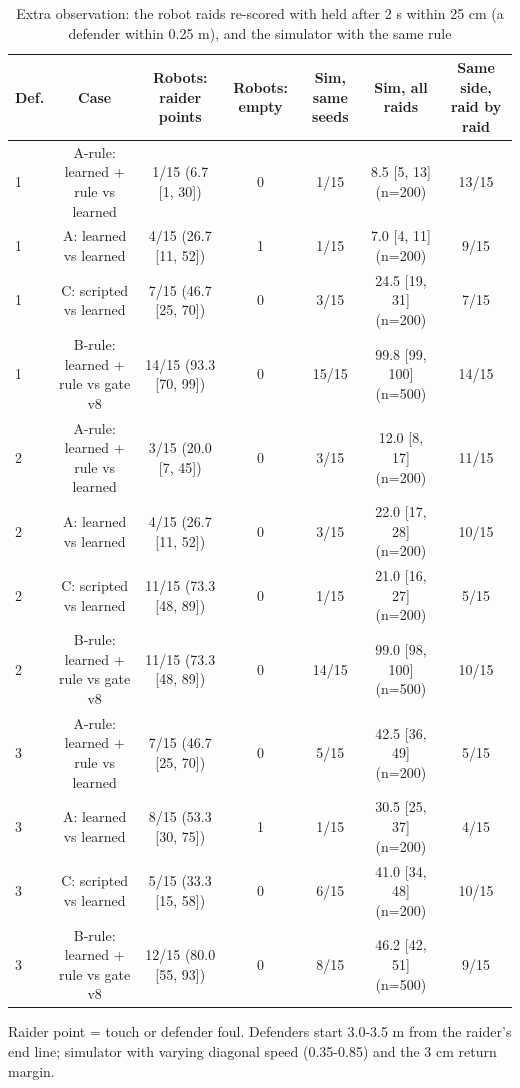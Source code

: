 \begin{table}[t]
\centering
\caption{Extra observation: the robot raids re-scored with held after 2 s within 25 cm (a defender within 0.25 m), and the simulator with the same rule}
\label{tab:T6_robot_runs_hold2}
\begin{tabular}{lcccccc}
\toprule
Def. & Case & Robots: raider points & Robots: empty & Sim, same seeds & Sim, all raids & Same side, raid by raid \\
\midrule
1 & A-rule: learned + rule vs learned & 1/15 (6.7 [1, 30]) & 0 & 1/15 & 8.5 [5, 13] (n=200) & 13/15 \\
1 & A: learned vs learned & 4/15 (26.7 [11, 52]) & 1 & 1/15 & 7.0 [4, 11] (n=200) & 9/15 \\
1 & C: scripted vs learned & 7/15 (46.7 [25, 70]) & 0 & 3/15 & 24.5 [19, 31] (n=200) & 7/15 \\
1 & B-rule: learned + rule vs gate v8 & 14/15 (93.3 [70, 99]) & 0 & 15/15 & 99.8 [99, 100] (n=500) & 14/15 \\
2 & A-rule: learned + rule vs learned & 3/15 (20.0 [7, 45]) & 0 & 3/15 & 12.0 [8, 17] (n=200) & 11/15 \\
2 & A: learned vs learned & 4/15 (26.7 [11, 52]) & 0 & 3/15 & 22.0 [17, 28] (n=200) & 10/15 \\
2 & C: scripted vs learned & 11/15 (73.3 [48, 89]) & 0 & 1/15 & 21.0 [16, 27] (n=200) & 5/15 \\
2 & B-rule: learned + rule vs gate v8 & 11/15 (73.3 [48, 89]) & 0 & 14/15 & 99.0 [98, 100] (n=500) & 10/15 \\
3 & A-rule: learned + rule vs learned & 7/15 (46.7 [25, 70]) & 0 & 5/15 & 42.5 [36, 49] (n=200) & 5/15 \\
3 & A: learned vs learned & 8/15 (53.3 [30, 75]) & 1 & 1/15 & 30.5 [25, 37] (n=200) & 4/15 \\
3 & C: scripted vs learned & 5/15 (33.3 [15, 58]) & 0 & 6/15 & 41.0 [34, 48] (n=200) & 10/15 \\
3 & B-rule: learned + rule vs gate v8 & 12/15 (80.0 [55, 93]) & 0 & 8/15 & 46.2 [42, 51] (n=500) & 9/15 \\
\bottomrule
\end{tabular}
\par\smallskip\footnotesize Raider point = touch or defender foul. Defenders start 3.0-3.5 m from the raider's end line; simulator with varying diagonal speed (0.35-0.85) and the 3 cm return margin.
\end{table}
